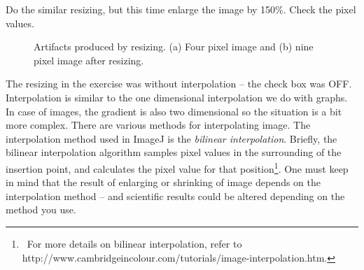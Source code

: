 \begin{indentexercise}{2}
Do the similar resizing, but this time enlarge
the image by 150\%. Check the pixel values.
\begin{figure}[htbp]
\centering
{}
\caption{ Artifacts produced by resizing. (a) Four pixel image and (b) nine pixel image after
resizing. }
\label{fig:resizing}
\end{figure} 

\end{indentexercise}

The resizing in the exercise was without interpolation -- the check box
was OFF. Interpolation is similar to the one dimensional interpolation
we do with graphs. In case of images, the gradient is also two
dimensional so the situation is a bit more complex. There are various
methods for interpolating image. The interpolation method used in
ImageJ is the \textit{bilinear interpolation}. Briefly, the bilinear
interpolation algorithm samples pixel values in the surrounding of the
insertion point, and calculates the pixel value for that
position\footnote{\ For more details on bilinear interpolation, refer
to\\
http://www.cambridgeincolour.com/tutorials/image-interpolation.htm.}.
One must keep in mind that the result of enlarging or shrinking of
image depends on the interpolation method -- and scientific results
could be altered depending on the method you use.

